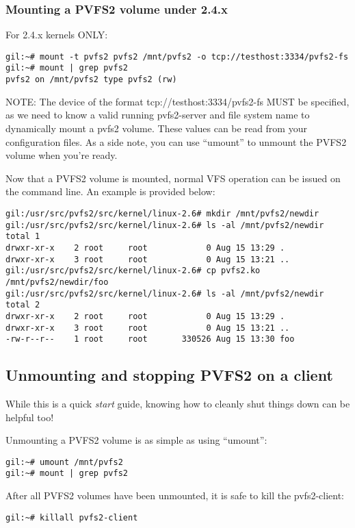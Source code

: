 \documentclass[11pt, letterpaper]{article}
\begin{document}
\subsubsection{Mounting a PVFS2 volume under 2.4.x}
For 2.4.x kernels ONLY:

\begin{verbatim}
gil:~# mount -t pvfs2 pvfs2 /mnt/pvfs2 -o tcp://testhost:3334/pvfs2-fs
gil:~# mount | grep pvfs2
pvfs2 on /mnt/pvfs2 type pvfs2 (rw)
\end{verbatim}

NOTE: The device of the format tcp://testhost:3334/pvfs2-fs MUST be
specified, as we need to know a valid running pvfs2-server and file
system name to dynamically mount a pvfs2 volume.  These values can be
read from your configuration files.  As a side note, you can use
``umount'' to unmount the PVFS2 volume when you're ready.

Now that a PVFS2 volume is mounted, normal VFS operation can be issued
on the command line.  An example is provided below:

\begin{verbatim}
gil:/usr/src/pvfs2/src/kernel/linux-2.6# mkdir /mnt/pvfs2/newdir
gil:/usr/src/pvfs2/src/kernel/linux-2.6# ls -al /mnt/pvfs2/newdir
total 1
drwxr-xr-x    2 root     root            0 Aug 15 13:29 .
drwxr-xr-x    3 root     root            0 Aug 15 13:21 ..
gil:/usr/src/pvfs2/src/kernel/linux-2.6# cp pvfs2.ko
/mnt/pvfs2/newdir/foo
gil:/usr/src/pvfs2/src/kernel/linux-2.6# ls -al /mnt/pvfs2/newdir
total 2
drwxr-xr-x    2 root     root            0 Aug 15 13:29 .
drwxr-xr-x    3 root     root            0 Aug 15 13:21 ..
-rw-r--r--    1 root     root       330526 Aug 15 13:30 foo
\end{verbatim}

\subsection{Unmounting and stopping PVFS2 on a client}

While this is a quick \emph{start} guide, knowing how to cleanly shut
things down can be helpful too!

Unmounting a PVFS2 volume is as simple as using ``umount'':
\begin{verbatim}
gil:~# umount /mnt/pvfs2
gil:~# mount | grep pvfs2
\end{verbatim}

After all PVFS2 volumes have been unmounted, it is safe to kill the
pvfs2-client:
\begin{verbatim}
gil:~# killall pvfs2-client
\end{verbatim}
\end{document}
